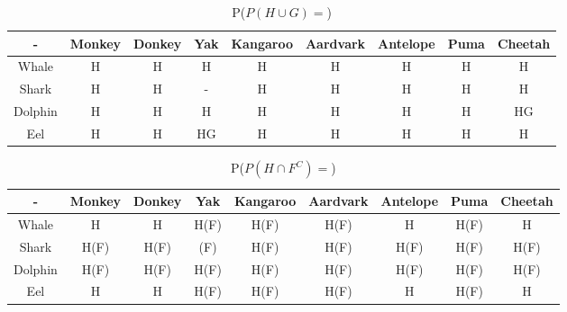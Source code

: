 \documentclass[11pt]{article}
\begin{document}
\begin{table}
\caption{P($ P(H\cup G)= $)}
  \begin{tabular}{|c|cccccccc|}
  	\hline
    - & Monkey & Donkey & Yak & Kangaroo & Aardvark & Antelope & Puma & Cheetah\\
    \hline
    Whale & H & H & H & H & H & H & H & H\\
    Shark & H & H & - & H & H & H & H & H\\
    Dolphin & H & H & H & H & H & H & H & HG\\
    Eel & H & H & HG & H & H & H & H & H\\
    \hline
  \end{tabular}
\end{table}
\begin{table}
\caption{P($ P(H\cap F^{C})= $)}
  \begin{tabular}{|c|cccccccc|}
  	\hline
    - & Monkey & Donkey & Yak & Kangaroo & Aardvark & Antelope & Puma & Cheetah\\
    \hline
    Whale & H & H & H(F) & H(F) & H(F) & H & H(F) & H\\
    Shark & H(F) & H(F) & (F) & H(F) & H(F) & H(F) & H(F) & H(F)\\
    Dolphin & H(F) & H(F) & H(F) & H(F) & H(F) & H(F) & H(F) & H(F)\\
    Eel & H & H & H(F) & H(F) & H(F) & H & H(F) & H\\
    \hline
  \end{tabular}
\end{table}
\end{document}
